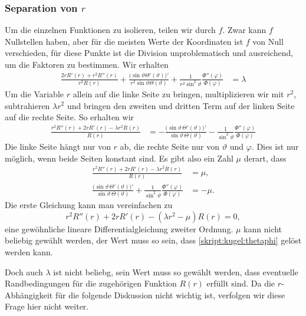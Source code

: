 \subsubsection{Separation von $r$}
Um die einzelnen Funktionen zu isolieren, teilen wir durch $f$.
Zwar kann $f$ Nullstellen haben, aber für die meisten Werte der Koordinaten
ist $f$ von Null verschieden, für diese Punkte ist die Division unproblematisch
und ausreichend, um die Faktoren zu bestimmen.
Wir erhalten
\begin{align*}
\frac{2rR'(r)+r^2R''(r)}{r^2R(r)}
+
\frac{
\bigl(\sin\vartheta\Theta'(\vartheta)\bigr)'
}{r^2\sin\vartheta\Theta(\vartheta)}
+
\frac{1}{r^2\sin^2\vartheta}\frac{\Phi''(\varphi)}{\Phi(\varphi)}
&=\lambda
\end{align*}
Um die Variable $r$ allein auf die linke Seite zu bringen, multiplizieren wir
mit $r^2$, subtrahieren $\lambda r^2$ und bringen den zweiten und dritten 
Term auf der linken Seite auf die rechte Seite.
So erhalten wir
\begin{align*}
\frac{r^2R''(r)+2rR'(r)-\lambda r^2R(r)}{R(r)}
&=
-
\frac{
\bigl(\sin\vartheta\,\Theta'(\vartheta)\bigr)'
}{\sin\vartheta\,\Theta(\vartheta)}
-\frac{1}{\sin^2\vartheta}\frac{\Phi''(\varphi)}{\Phi(\varphi)}
\end{align*}
Die linke Seite hängt nur von $r$ ab, die rechte Seite nur von $\vartheta$
und $\varphi$.
Dies ist nur möglich, wenn beide Seiten konstant sind.
Es gibt also ein Zahl $\mu$ derart, dass
\begin{align}
\frac{r^2R''(r)+2rR'(r)-\lambda r^2R(r)}{R(r)}&=\mu,
\\
\frac{\bigl(\sin\vartheta\,\Theta'(\vartheta)\bigr)'}{\sin\vartheta\,\Theta(\vartheta)}
+
\frac{1}{\sin^2\vartheta}\frac{\Phi''(\varphi)}{\Phi(\varphi)}
&=
-\mu.
\label{skript:kugel:thetaphi}
\end{align}
Die erste Gleichung kann man vereinfachen zu
\begin{equation}
r^2R''(r)+2rR'(r)-(\lambda r^2-\mu)R(r) = 0,
\end{equation}
eine gewöhnliche lineare Differentialgleichung zweiter Ordnung.
$\mu$ kann nicht beliebig gewählt werden, der Wert muss so sein,
dass \eqref{skript:kugel:thetaphi} gelöst werden kann.

Doch auch $\lambda$ ist nicht beliebg, sein Wert muss so gewählt
werden, dass eventuelle Randbedingungen für die zugehörigen Funktion
$R(r)$ erfüllt sind.
Da die $r$-Abhängigkeit für die folgende Diskussion nicht wichtig ist,
verfolgen wir diese Frage hier nicht weiter.

